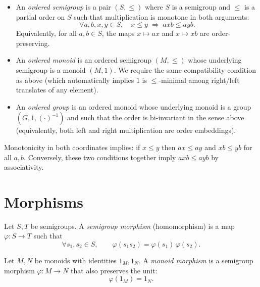 \begin{definition}
\label{def:ordered-structures}
\leavevmode
\begin{itemize}
  \item An \emph{ordered semigroup} is a pair \((S,\le)\) where \(S\) is a semigroup and \(\le\) is a partial order on \(S\) such that multiplication is monotone in both arguments:
  \[
    \forall a,b,x,y\in S,\quad x\le y \;\Longrightarrow\; a x b \le a y b.
  \]
  Equivalently, for all \(a,b\in S\), the maps \(x\mapsto a x\) and \(x\mapsto x b\) are order-preserving.
  \item An \emph{ordered monoid} is an ordered semigroup \((M,\le)\) whose underlying semigroup is a monoid \((M,1)\). We require the same compatibility condition as above (which automatically implies \(1\) is \(\le\)-minimal among right/left translates of any element).
  \item An \emph{ordered group} is an ordered monoid whose underlying monoid is a group \((G,1,(\cdot)^{-1})\) and such that the order is bi-invariant in the sense above (equivalently, both left and right multiplication are order embeddings).
\end{itemize}
\end{definition}

\begin{remark}
Monotonicity in both coordinates implies: if \(x\le y\) then \(a x \le a y\) and \(x b \le y b\) for all \(a,b\). Conversely, these two conditions together imply \(a x b \le a y b\) by associativity.
\end{remark}


\chapter {Morphisms}

\begin{definition}
\label{def:semigroup-morphism}
Let \(S,T\) be semigroups. A \emph{semigroup morphism} (homomorphism) is a map \(\varphi:S\to T\) such that
\[
\forall s_1,s_2\in S,\qquad \varphi(s_1 s_2)=\varphi(s_1)\,\varphi(s_2).
\]
\end{definition}

\begin{definition}
\label{def:monoid-morphism}
Let \(M,N\) be monoids with identities \(1_M,1_N\). A \emph{monoid morphism} is a semigroup morphism \(\varphi:M\to N\) that also preserves the unit:
\[
\varphi(1_M)=1_N.
\]
\end{definition}


